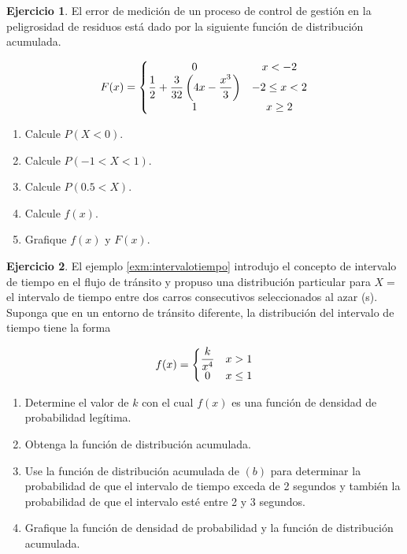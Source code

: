 \documentclass[
  11pt,
]{book}
\providecommand{\tightlist}{%
  \setlength{\itemsep}{0pt}\setlength{\parskip}{0pt}}
\theoremstyle{definition}
\theoremstyle{definition}
\theoremstyle{definition}
\newtheorem{exercise}{Ejercicio}[chapter]
\theoremstyle{definition}
\theoremstyle{remark}
\begin{document}
\begin{exercise}

El error de medición de un proceso de control de gestión en la peligrosidad de residuos está dado por la siguiente función de distribución acumulada.

\begin{equation}
  \notag
  F(x) = \left\lbrace
  \begin{matrix}
    0 & x < -2 \\
    \displaystyle\frac{1}{2} + \displaystyle\frac{3}{32}\left(4x-\displaystyle\frac{x^3}{3}\right) & -2\leq x < 2 \\
    1 & x \geq 2\\
  \end{matrix} \right.
\end{equation}

\begin{enumerate}
\def\labelenumi{\alph{enumi}.}
\tightlist
\item
  Calcule \(P(X < 0)\).
\item
  Calcule \(P(-1 < X < 1)\).
\item
  Calcule \(P(0.5 < X)\).
\item
  Calcule \(f(x)\).
\item
  Grafique \(f(x)\) y \(F(x)\).
\end{enumerate}

\end{exercise}

\begin{exercise}

El ejemplo \ref{exm:intervalotiempo} introdujo el concepto de intervalo de tiempo en el flujo de tránsito y propuso una distribución particular para \(X =\) el intervalo de tiempo entre dos carros consecutivos seleccionados al azar (s). Suponga que en un entorno de tránsito diferente, la distribución del intervalo de tiempo tiene la forma

\begin{equation}
  \notag
  f(x) = \left\lbrace
  \begin{matrix}
    \displaystyle\frac{k}{x^4} & x > 1 \\
    0 & x \leq 1\\
  \end{matrix} \right.
\end{equation}

\begin{enumerate}
\def\labelenumi{\alph{enumi}.}
\tightlist
\item
  Determine el valor de \(k\) con el cual \(f(x)\) es una función de densidad de probabilidad legítima.
\item
  Obtenga la función de distribución acumulada.
\item
  Use la función de distribución acumulada de \((b)\) para determinar la probabilidad de que el intervalo de tiempo exceda de 2 segundos y también la probabilidad de que el intervalo esté entre 2 y 3 segundos.
\item
  Grafique la función de densidad de probabilidad y la función de distribución acumulada.
\end{enumerate}

\end{exercise}
\end{document}
